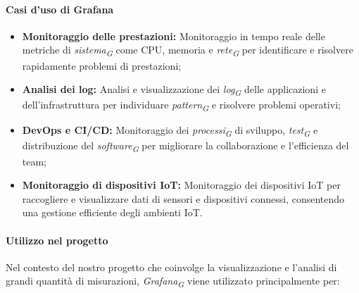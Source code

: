 \paragraph{Casi d'uso di Grafana}
\begin{itemize}
    \item \textbf{Monitoraggio delle prestazioni:} Monitoraggio in tempo reale delle metriche di \textit{sistema}\textsubscript{\textit{G}} come CPU, memoria e \textit{rete}\textsubscript{\textit{G}} per identificare e risolvere rapidamente problemi di prestazioni;
    
    \item \textbf{Analisi dei log:} Analisi e visualizzazione dei \textit{log}\textsubscript{\textit{G}} delle applicazioni e dell'infrastruttura per individuare \textit{pattern}\textsubscript{\textit{G}} e risolvere problemi operativi;
    
    \item \textbf{DevOps e CI/CD:} Monitoraggio dei \textit{processi}\textsubscript{\textit{G}} di sviluppo, \textit{test}\textsubscript{\textit{G}} e distribuzione del \textit{software}\textsubscript{\textit{G}} per migliorare la collaborazione e l'efficienza del team;
    
    \item \textbf{Monitoraggio di dispositivi IoT:} Monitoraggio dei dispositivi IoT per raccogliere e visualizzare dati di sensori e dispositivi connessi, consentendo una gestione efficiente degli ambienti IoT.
\end{itemize}

\paragraph{Utilizzo nel progetto}
Nel contesto del nostro progetto che coinvolge la visualizzazione e l'analisi di grandi quantità di misurazioni, \textit{Grafana}\textsubscript{\textit{G}} viene utilizzato principalmente per:

